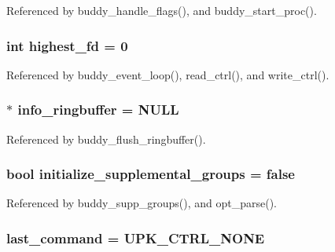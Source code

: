 Referenced by buddy\_\-handle\_\-flags(), and buddy\_\-start\_\-proc().

\subsubsection[{highest\_\-fd}]{\setlength{\rightskip}{0pt plus 5cm}int {\bf highest\_\-fd} = 0\hspace{0.3cm}{\ttfamily  [static]}}\label{buddy_8c_a15129627630d61eba3b083241572c781}


Referenced by buddy\_\-event\_\-loop(), read\_\-ctrl(), and write\_\-ctrl().

\subsubsection[{info\_\-ringbuffer}]{$\ast$ {\bf info\_\-ringbuffer} = NULL\hspace{0.3cm}{\ttfamily  [static]}}\label{buddy_8c_a5a216a38f05caa35201f9382808984b9}


Referenced by buddy\_\-flush\_\-ringbuffer().

\subsubsection[{initialize\_\-supplemental\_\-groups}]{\setlength{\rightskip}{0pt plus 5cm}bool {\bf initialize\_\-supplemental\_\-groups} = false}\label{buddy_8c_ab0872a08f4362ca27dba55fcef64c24f}


Referenced by buddy\_\-supp\_\-groups(), and opt\_\-parse().

\subsubsection[{last\_\-command}]{ {\bf last\_\-command} = UPK\_\-CTRL\_\-NONE\hspace{0.3cm}{\ttfamily  [static]}}\label{buddy_8c_afac02348ed45a2ad675379a8ca104518}


